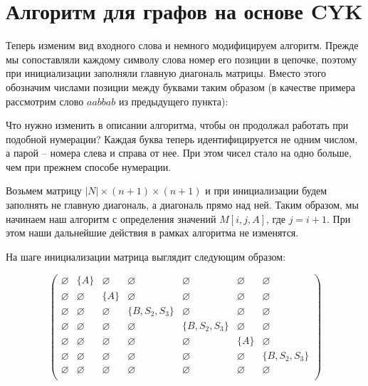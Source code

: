 \section{Алгоритм для графов на основе CYK}
\label{graph:CYK}
Теперь изменим вид входного слова и немного модифицируем алгоритм. Прежде мы сопоставляли каждому символу слова номер его позиции в цепочке, поэтому при инициализации заполняли главную диагональ матрицы. Вместо этого обозначим числами позиции между буквами таким образом (в качестве примера рассмотрим слово $a a b b a b$ из предыдущего пункта):

\begin{center}
\end{center}

Что нужно изменить в описании алгоритма, чтобы он продолжал работать при подобной нумерации? Каждая буква теперь идентифицируется не одним числом, а парой – номера слева и справа от нее. При этом чисел стало на одно больше, чем при прежнем способе нумерации.

Возьмем матрицу  $|N| \times (n + 1) \times (n + 1)$ и при инициализации будем заполнять не главную диагональ, а диагональ прямо над ней. Таким образом, мы начинаем наш алгоритм с определения значений $M[i, j, A] \text{, где } j = i + 1$. При этом наши дальнейшие действия в рамках алгоритма не изменятся.

На шаге инициализации матрица выглядит следующим образом:

\[
\begin{pmatrix}
\varnothing & \{A\}       & \varnothing & \varnothing    & \varnothing    & \varnothing & \varnothing    \\
\varnothing & \varnothing & \{A\}     & \varnothing    & \varnothing      & \varnothing & \varnothing    \\
\varnothing & \varnothing & \varnothing & \{B, S_2, S_3\} & \varnothing       & \varnothing & \varnothing    \\
\varnothing & \varnothing & \varnothing & \varnothing    & \{B, S_2, S_3\} & \varnothing & \varnothing   \\
\varnothing & \varnothing & \varnothing & \varnothing    & \varnothing    & \{A\}       & \varnothing    \\
\varnothing & \varnothing & \varnothing & \varnothing    & \varnothing    & \varnothing & \{B, S_2, S_3\} \\
\varnothing & \varnothing & \varnothing & \varnothing    & \varnothing    & \varnothing & \varnothing    \\

\end{pmatrix}
\]

